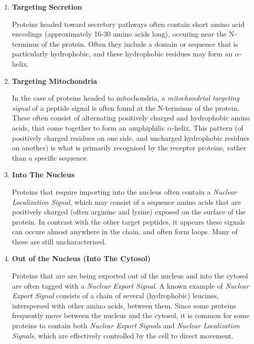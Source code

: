 \documentclass{bioinfo}
\begin{document}
\begin{enumerate}
  \item {\textbf{Targeting Secretion}} 

  Proteins headed toward secretory pathways often contain short amino acid encodings (approximately 16-30 amino acids long), occuring near the N-terminus of the protein. Often they include a domain or sequence that is particularly hydrophobic, and these hydrophobic residues may form an $\alpha$-helix. 

  \item {\textbf{Targeting Mitochondria}} 

  In the case of proteins headed to mitochondria, a \textit{mitochondrial targeting signal} of a peptide signal is often found at the N-terminus of the protein. These often consist of alternating positively charged and hydrophobic amino acids, that come together to form an amphiphilic $\alpha$-helix. This pattern (of positively charged residues on one side, and uncharged hydrophobic residues on another) is what is primarily recognised by the receptor proteins, rather than a specific sequence.

  \item {\textbf{Into The Nucleus}} 

  Proteins that require importing into the nucleus often contain a \textit{Nuclear Localization Signal}, which may consist of a sequence amino acids that are positively charged (often arginine and lysine) exposed on the surface of the protein. 
  In contrast with the other target peptides, it appears these signals can occure almost anywhere in the chain, and often form loops. Many of these are still uncharacterised.  

   \item {\textbf{Out of the Nucleus (Into The Cytosol)}} 

  Proteins that are are being exported out of the nucleus and into the cytosol are often tagged with a \textit{Nuclear Export Signal}. 
  A known example of \textit{Nuclear Export Signal} consists of a chain of several (hydrophobic) leucines, interspersed with other amino acids, between them. 
  Since some proteins frequently move between the nucleus and the cytosol, it is common for some proteins to contain both  \textit{Nuclear Export Signals} and \textit{Nuclear Localization Signals}, which are effectively controlled by the cell to direct movement.



\end{enumerate} 
\end{document}
